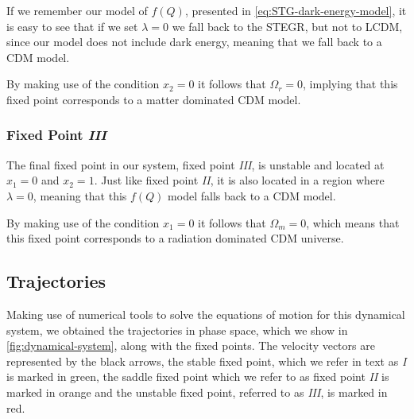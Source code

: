 If we remember our model of $f(Q)$, presented in \cref{eq:STG-dark-energy-model}, it is easy to see that if we set $\lambda = 0$ we fall back to the \gls{STEGR}, but not to \gls{LCDM}, since our model does not include dark energy, meaning that we fall back to a \gls{CDM} model.

By making use of the condition $x_2 = 0$ it follows that $\Omega_r = 0$, implying that this fixed point corresponds to a matter dominated \gls{CDM} model.

\subsubsection{Fixed Point \textit{III}}
The final fixed point in our system, fixed point \textit{III}, is unstable and located at $x_1 = 0$ and $x_2 = 1$. Just like fixed point \textit{II}, it is also located in a region where $\lambda = 0$, meaning that this $f(Q)$ model falls back to a \gls{CDM} model.

By making use of the condition $x_1 = 0$ it follows that $\Omega_m = 0$, which means that this fixed point corresponds to a radiation dominated \gls{CDM} universe.


\subsection{Trajectories}
\label{subsec:trajectories}

Making use of numerical tools to solve the equations of motion for this dynamical system, we obtained the trajectories in phase space, which we show in \cref{fig:dynamical-system}, along with the fixed points. The velocity vectors are represented by the black arrows, the stable fixed point, which we refer in text as \textit{I} is marked in green, the saddle fixed point which we refer to as fixed point \textit{II} is marked in orange and the unstable fixed point, referred to as \textit{III}, is marked in red.


